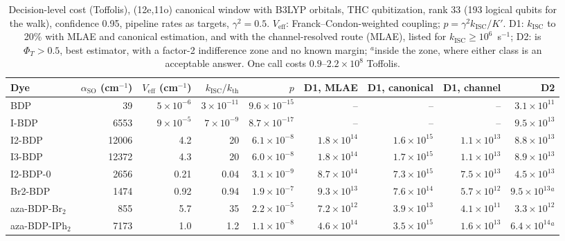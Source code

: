 \documentclass[journal=jctcce,manuscript=article]{achemso}
\newcommand{\kisc}{k_\mathrm{ISC}}
\newcommand{\aso}{\alpha_\mathrm{SO}}
\begin{document}
\begin{table}
  \caption{Decision-level cost (Toffolis), (12e,11o) canonical window with B3LYP orbitals, THC
  qubitization, rank 33 (193 logical qubits for the walk), confidence 0.95, pipeline rates as targets, $\gamma^2=0.5$.
  $V_\mathrm{eff}$: Franck--Condon-weighted coupling; $p=\gamma^2\kisc/K'$. D1: $\kisc$ to 20\% with MLAE and
  canonical estimation, and with the channel-resolved route (MLAE), listed for $\kisc\ge10^{6}$~s$^{-1}$; D2:
  is $\Phi_T>0.5$, best estimator, with a factor-2 indifference zone and no known margin; $^a$inside the zone, where either
  class is an acceptable answer. One call costs $0.9$--$2.2\times10^{8}$ Toffolis.}
  \label{tab:decision}
  \scriptsize\setlength{\tabcolsep}{2pt}
  \begin{tabular}{lrrrrrrrr}
    \toprule
    Dye & $\aso$ (cm$^{-1}$) & $V_\mathrm{eff}$ (cm$^{-1}$) & $\kisc/k_\mathrm{th}$ & $p$ &
    D1, MLAE & D1, canonical & D1, channel & D2 \\
    \midrule
    BDP & 39 & $5\times10^{-6}$ & $3\times10^{-11}$ & $9.6\times10^{-15}$ & -- & -- & -- & $3.1\times10^{11}$ \\
    I-BDP & 6553 & $9\times10^{-5}$ & $7\times10^{-9}$ & $8.7\times10^{-17}$ & -- & -- & -- & $9.5\times10^{13}$ \\
    I2-BDP & 12006 & 4.2 & 20 & $6.1\times10^{-8}$ & $1.8\times10^{14}$ & $1.6\times10^{15}$ & $1.1\times10^{13}$ & $8.8\times10^{13}$ \\
    I3-BDP & 12372 & 4.3 & 20 & $6.0\times10^{-8}$ & $1.8\times10^{14}$ & $1.7\times10^{15}$ & $1.1\times10^{13}$ & $8.9\times10^{13}$ \\
    I2-BDP-0 & 2656 & 0.21 & 0.04 & $3.1\times10^{-9}$ & $8.7\times10^{14}$ & $7.3\times10^{15}$ & $7.5\times10^{13}$ & $4.5\times10^{13}$ \\
    Br2-BDP & 1474 & 0.92 & 0.94 & $1.9\times10^{-7}$ & $9.3\times10^{13}$ & $7.6\times10^{14}$ & $5.7\times10^{12}$ & $9.5\times10^{13}$$^a$ \\
    aza-BDP-Br$_2$ & 855 & 5.7 & 35 & $2.2\times10^{-5}$ & $7.2\times10^{12}$ & $3.9\times10^{13}$ & $4.1\times10^{11}$ & $3.3\times10^{12}$ \\
    aza-BDP-IPh$_2$ & 7173 & 1.0 & 1.2 & $1.1\times10^{-8}$ & $4.6\times10^{14}$ & $3.5\times10^{15}$ & $1.6\times10^{13}$ & $6.4\times10^{14}$$^a$ \\
    \bottomrule
  \end{tabular}
\end{table}
\end{document}
